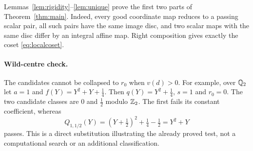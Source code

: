 Lemmas~\ref{lem:rigidity}--\ref{lem:unique} prove the first two parts
of Theorem~\ref{thm:main}. Indeed, every good coordinate map reduces
to a passing scalar pair, all such pairs have the same image disc,
and two scalar maps with the same disc differ by an integral affine
map. Right composition gives exactly the coset
\eqref{eq:localcoset}.

\paragraph{Wild-centre check.}
The candidates cannot be collapsed to $r_0$ when $v(d)>0$.
For example, over $\mathbb Q_2$ let $a=1$ and
$f(Y)=Y^2+Y+\tfrac14$. Then $q(Y)=Y^2+\tfrac14$, $s=1$ and
$r_0=0$. The two candidate classes are $0$ and $\tfrac12$ modulo
$\mathbb Z_2$. The first fails its constant coefficient, whereas
\[
 Q_{1,1/2}(Y)=(Y+\tfrac12)^2+\tfrac14-\tfrac12=Y^2+Y
\]
passes. This is a direct substitution illustrating the already proved
test, not a computational search or an additional classification.
